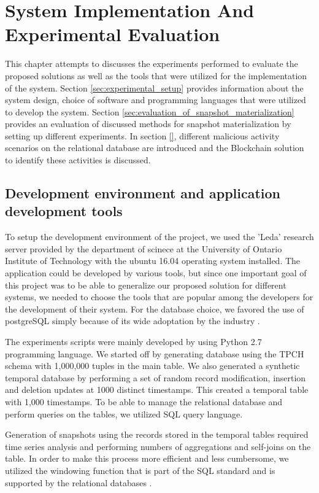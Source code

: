\chapter{System Implementation And Experimental Evaluation} \label{chap:system_implementation}
    This chapter attempts to discusses the experiments performed to evaluate the proposed solutions as well as the tools that were utilized for the implementation of the system. Section \ref{sec:experimental_setup} provides information about the system design, choice of software and programming languages that were utilized to develop the system. Section \ref{sec:evaluation_of_snapshot_materialization} provides an evaluation of discussed methods for snapshot materialization by setting up different experiments. In section \ref{}, different malicious activity scenarios on the relational database are introduced and the Blockchain solution to identify these activities is discussed.

	\section{Development environment and application development tools} \label{sec:development environment}
		To setup the development environment of the project, we used the 'Leda' research server provided by the department of scinece at the University of Ontario Institute of Technology with the ubuntu 16.04 operating system installed. The application could be developed by various tools, but since one important goal of this project was to be able to generalize our proposed solution for different systems, we needed to choose the tools that are popular among the developers for the development of their system. For the database choice, we favored the use of postgreSQL simply because of its wide adoptation by the industry \cite{cook2017docker}. 

		The experiments scripts were mainly developed by using Python 2.7 programming language. We started off by generating database using the TPCH schema with 1,000,000 tuples in the main table. We also generated a synthetic temporal database by performing a set of random record modification, insertion and deletion updates at 1000 distinct timestamps. This created a temporal table with 1,000 timestamps. To be able to manage the relational database and perform queries on the tables, we utilized SQL query language.

		Generation of snapshots using the records stored in the temporal tables required time series analysis and performing numbers of aggregations and self-joins on the table. In order to make this process more efficient and less cumbersome, we utilized the windowing function that is part of the SQL standard and is supported by the relational databases \cite{leis2015efficient}.

